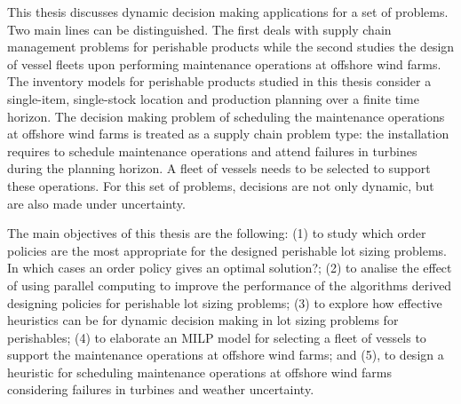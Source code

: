 \begin{abstractslongEnglish} 
This thesis discusses dynamic decision making applications for a set of problems. Two main lines can be distinguished. The first deals with supply chain management problems for perishable products while the second studies the design of vessel fleets upon performing maintenance operations at offshore wind farms. The inventory models for perishable products studied in this thesis consider a single-item, single-stock location and production planning over a finite time horizon. The decision making problem of scheduling the maintenance operations at offshore wind farms is treated as a supply chain problem type: the installation requires to schedule maintenance operations and attend failures in turbines during the planning horizon. A fleet of vessels needs to be selected to support these operations.  For this set of problems, decisions are not only dynamic, but are also made under uncertainty.

The main objectives of this thesis are the following: (1) to study which order policies are the most appropriate for the designed perishable lot sizing problems. In which cases an order policy gives an optimal solution?; (2) to analise the effect of using parallel computing to improve the performance of the algorithms derived designing policies for perishable lot sizing problems; (3) to explore how effective heuristics can be for dynamic decision making in lot sizing problems for perishables; (4) to elaborate an MILP model for selecting a fleet of vessels to support the maintenance operations at offshore wind farms; and (5), to design a heuristic for scheduling maintenance operations at offshore wind farms considering failures in turbines and weather uncertainty.


\end{abstractslongEnglish}
